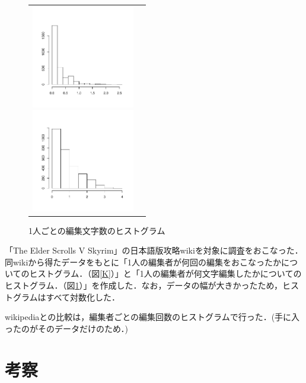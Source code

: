 \documentclass[uplatex,twocolumn,dvipdfmx]{jsarticle}
\begin{document}
\begin{figure}[thbp]
\begin{tabular}{cc}
 \begin{minipage}{0.5\hsize}
  \begin{center}
   \includegraphics[width=45mm]{logk.pdf}
   \caption{編集回数のヒストグラム}
   \label{K}
  \end{center}
 \end{minipage}%
 \begin{minipage}{0.5\hsize}
  \begin{center}
   \includegraphics[width=45mm]{logm.pdf}
   \caption{1人ごとの編集文字数のヒストグラム}
   \label{M}
  \end{center}
 \end{minipage}
 \end{tabular}
 \end{figure}

「The Elder Scrolls V Skyrim」\cite{wikipedia}の日本語版攻略wiki\cite{wiki}を対象に調査をおこなった．同wikiから得たデータをもとに「1人の編集者が何回の編集をおこなったかについてのヒストグラム．（図\ref{K}）」と「1人の編集者が何文字編集したかについてのヒストグラム．（図\ref{M}）」を作成した．なお，データの幅が大きかったため，ヒストグラムはすべて対数化した．

wikipediaとの比較は，編集者ごとの編集回数のヒストグラムで行った．(手に入ったのがそのデータだけのため．)

\section{考察}
\end{document}
